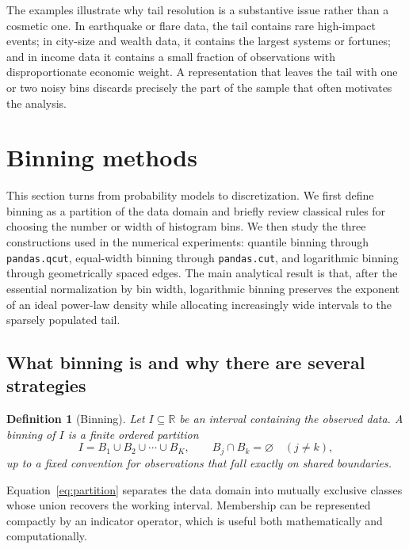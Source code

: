 \documentclass[12pt]{article}
\newcommand{\R}{\mathbb{R}}
\newtheorem{definition}{Definition}[section]
\numberwithin{equation}{section}
\begin{document}
The examples illustrate why tail resolution is a substantive issue rather than a cosmetic one. In earthquake or flare data, the tail contains rare high-impact events; in city-size and wealth data, it contains the largest systems or fortunes; and in income data it contains a small fraction of observations with disproportionate economic weight. A representation that leaves the tail with one or two noisy bins discards precisely the part of the sample that often motivates the analysis.

\section{Binning methods}

This section turns from probability models to discretization. We first define binning as a partition of the data domain and briefly review classical rules for choosing the number or width of histogram bins. We then study the three constructions used in the numerical experiments: quantile binning through \texttt{pandas.qcut}, equal-width binning through \texttt{pandas.cut}, and logarithmic binning through geometrically spaced edges. The main analytical result is that, after the essential normalization by bin width, logarithmic binning preserves the exponent of an ideal power-law density while allocating increasingly wide intervals to the sparsely populated tail.

\subsection{What binning is and why there are several strategies}

\begin{definition}[Binning]
Let $I\subseteq\R$ be an interval containing the observed data. A binning of $I$ is a finite ordered partition
\begin{equation}
 I=B_1\cup B_2\cup\cdots\cup B_K,
 \qquad B_j\cap B_k=\varnothing\quad(j\neq k),
\label{eq:partition}
\end{equation}
up to a fixed convention for observations that fall exactly on shared boundaries.
\end{definition}

Equation~\eqref{eq:partition} separates the data domain into mutually exclusive classes whose union recovers the working interval. Membership can be represented compactly by an indicator operator, which is useful both mathematically and computationally.
\end{document}
